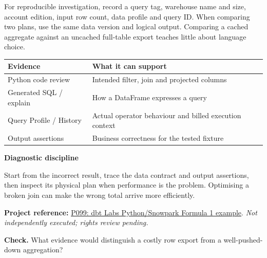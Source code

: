 \documentclass[11pt,twoside]{article}
\newcommand{\repo}[2]{\par\begingroup\fontsize{8.0}{9.6}\selectfont\sffamily\color{inkgray}\textbf{Project reference:} \href{#2}{#1}. \textit{Not independently executed; rights review pending.}\par\endgroup}
\begin{document}
For reproducible investigation, record a query tag, warehouse name and size, account edition, input row count, data profile and query ID. When comparing two plans, use the same data version and logical output. Comparing a cached aggregate against an uncached full-table export teaches little about language choice.
\begin{center}\renewcommand{\arraystretch}{1.1}\begin{tabularx}{\linewidth}{@{}p{32mm}X@{}}\toprule
\textbf{Evidence}&\textbf{What it can support}\\\midrule
Python code review&Intended filter, join and projected columns\\
Generated SQL / explain&How a DataFrame expresses a query\\
Query Profile / History&Actual operator behaviour and billed execution context\\
Output assertions&Business correctness for the tested fixture\\\bottomrule
\end{tabularx}\end{center}
\begin{insight}\textbf{Diagnostic discipline}\par
Start from the incorrect result, trace the data contract and output assertions, then inspect its physical plan when performance is the problem. Optimising a broken join can make the wrong total arrive more efficiently.\end{insight}
\repo{P099: dbt Labs Python/Snowpark Formula 1 example}{https://github.com/dbt-labs/python-snowpark-formula1}
\textbf{Check.} What evidence would distinguish a costly row export from a well-pushed-down aggregation?
\newpage
\end{document}
